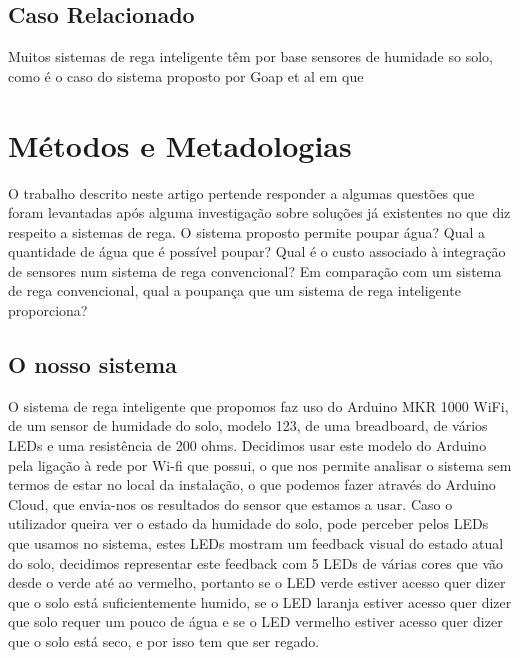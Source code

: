 \documentclass[conference]{IEEEtran}
\begin{document}
\subsection{Caso Relacionado}

Muitos sistemas de rega inteligente têm por base sensores de humidade so solo, como 
é o caso do sistema proposto por Goap et al \cite{goap2018an} em que 

\section{Métodos e Metadologias}
O trabalho descrito neste artigo pertende responder a algumas questões que foram 
levantadas após alguma investigação sobre soluções já existentes no que diz respeito 
a sistemas de rega. O sistema proposto permite poupar água? Qual a quantidade de água 
que é possível poupar?  Qual é o custo associado à integração de sensores num sistema 
de rega convencional? Em comparação com um sistema de rega convencional, 
qual a poupança que um sistema de rega inteligente proporciona?

\subsection{O nosso sistema}

O sistema de rega inteligente que propomos faz uso do Arduino MKR 1000 WiFi, de um sensor de 
humidade do solo, modelo 123, de uma breadboard, de vários LEDs e uma resistência de 200 ohms. 
Decidimos usar este modelo do Arduino pela ligação à rede por Wi-fi que possui, o que nos 
permite analisar o sistema sem termos de estar no local da instalação, o que podemos fazer através do 
Arduino Cloud, que envia-nos os resultados do sensor que estamos a usar. Caso o utilizador 
queira ver o estado da humidade do solo, pode perceber pelos LEDs que usamos no sistema, estes 
LEDs mostram um feedback visual do estado atual do solo, decidimos representar este 
feedback com 5 LEDs de várias cores que vão desde o verde até ao vermelho, portanto 
se o LED verde estiver acesso quer dizer que o solo está suficientemente humido, se 
o LED laranja estiver acesso quer dizer que solo requer um pouco de água e se o LED
vermelho estiver acesso quer dizer que o solo está seco, e por isso tem que ser regado.
\end{document}
